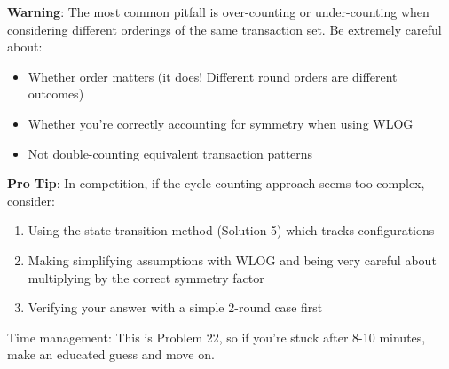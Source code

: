 \documentclass[]{article}
\begin{document}
\begin{warningbox}
\textbf{Warning}: The most common pitfall is over-counting or under-counting when considering different orderings of the same transaction set. Be extremely careful about:
\begin{itemize}
    \item Whether order matters (it does! Different round orders are different outcomes)
    \item Whether you're correctly accounting for symmetry when using WLOG
    \item Not double-counting equivalent transaction patterns
\end{itemize}
\end{warningbox}

\begin{tipbox}
\textbf{Pro Tip}: In competition, if the cycle-counting approach seems too complex, consider:
\begin{enumerate}
    \item Using the state-transition method (Solution 5) which tracks configurations
    \item Making simplifying assumptions with WLOG and being very careful about multiplying by the correct symmetry factor
    \item Verifying your answer with a simple 2-round case first
\end{enumerate}
Time management: This is Problem 22, so if you're stuck after 8-10 minutes, make an educated guess and move on.
\end{tipbox}
\end{document}
